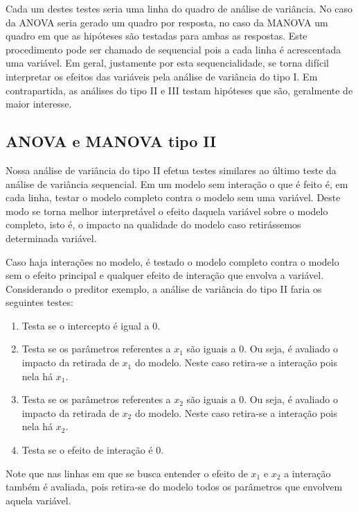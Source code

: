 Cada um destes testes seria uma linha do quadro de análise de variância. No caso da ANOVA seria gerado um quadro por resposta, no caso da MANOVA um quadro em que as hipóteses são testadas para ambas as respostas. Este procedimento pode ser chamado de sequencial pois a cada linha é acrescentada uma variável. Em geral, justamente por esta sequencialidade, se torna difícil interpretar os efeitos das variáveis pela análise de variância do tipo I. Em contrapartida, as análises do tipo II e III testam hipóteses que são, geralmente de maior interesse.

\subsection{ANOVA e MANOVA tipo II}

Nossa análise de variância do tipo II efetua testes similares ao último teste da análise de variância sequencial. Em um modelo sem interação o que é feito é, em cada linha, testar o modelo completo contra o modelo sem uma variável. Deste modo se torna melhor interpretável o efeito daquela variável sobre o modelo completo, isto é, o impacto na qualidade do modelo caso retirássemos determinada variável.

Caso haja interações no modelo, é testado o modelo completo contra o modelo sem o efeito principal e qualquer efeito de interação que envolva a variável. Considerando o preditor exemplo, a análise de variância do tipo II faria os seguintes testes:

\begin{enumerate}
  \item Testa se o intercepto é igual a 0.
  
  \item Testa se os parâmetros referentes a $x_1$ são iguais a 0. Ou seja, é avaliado o impacto da retirada de $x_1$ do modelo. Neste caso retira-se a interação pois nela há $x_1$.
  
  \item Testa se os parâmetros referentes a $x_2$ são iguais a 0. Ou seja, é avaliado o impacto da retirada de $x_2$ do modelo. Neste caso retira-se a interação pois nela há $x_2$.
  
  \item Testa se o efeito de interação é 0.

\end{enumerate}

Note que nas linhas em que se busca entender o efeito de $x_1$ e $x_2$ a interação também é avaliada, pois retira-se do modelo todos os parâmetros que envolvem aquela variável.

